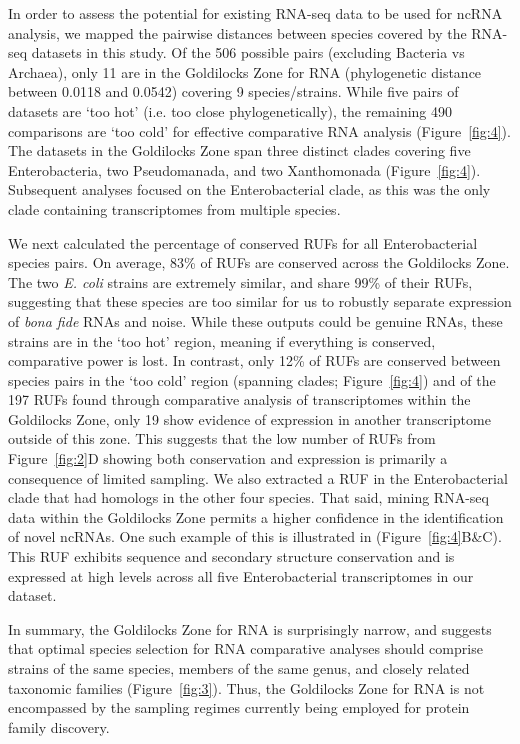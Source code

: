 \documentclass[10pt]{article}
\begin{document}
In order to assess the potential for existing RNA-seq data to be used
for ncRNA analysis, we mapped the pairwise distances between species
covered by the RNA-seq datasets in this study. Of the 506 possible
pairs (excluding Bacteria vs Archaea), only 11 are in the Goldilocks
Zone for RNA (phylogenetic distance between 0.0118 and 0.0542)
covering 9 species/strains. While five pairs of datasets are ‘too hot’
(i.e. too close phylogenetically), the remaining 490 comparisons are
‘too cold’ for effective comparative RNA analysis
(Figure~\ref{fig:4}). The datasets in the Goldilocks Zone span three
distinct clades covering five Enterobacteria, two Pseudomanada, and
two Xanthomonada (Figure~\ref{fig:4}). Subsequent analyses focused on
the Enterobacterial clade, as this was the only clade containing
transcriptomes from multiple species.

We next calculated the percentage of conserved RUFs for all
Enterobacterial species pairs. On average, 83\% of RUFs are conserved
across the Goldilocks Zone. The two \emph{E. coli} strains are extremely
similar, and share 99\% of their RUFs, suggesting that these species
are too similar for us to robustly separate expression of \emph{bona fide}
RNAs and noise. While these outputs could be genuine RNAs, these
strains are in the ‘too hot’ region, meaning if everything is
conserved, comparative power is lost. In contrast, only 12\% of RUFs
are conserved between species pairs in the ‘too cold’ region (spanning
clades; Figure~\ref{fig:4}) and of the 197 RUFs found through
comparative analysis of transcriptomes within the Goldilocks Zone,
only 19 show evidence of expression in another transcriptome outside
of this zone. This suggests that the low number of RUFs from
Figure~\ref{fig:2}D showing both conservation and expression is
primarily a consequence of limited sampling.  We also extracted a RUF
in the Enterobacterial clade that had homologs in the other four
species.  That said, mining RNA-seq data within the Goldilocks Zone
permits a higher confidence in the identification of novel ncRNAs. One
such example of this is illustrated in (Figure~\ref{fig:4}B\&C). This
RUF exhibits sequence and secondary structure conservation and is
expressed at high levels across all five Enterobacterial
transcriptomes in our dataset.

In summary, the Goldilocks Zone for RNA is surprisingly narrow, and
suggests that optimal species selection for RNA comparative analyses
should comprise strains of the same species, members of the same
genus, and closely related taxonomic families (Figure~\ref{fig:3}). Thus, the
Goldilocks Zone for RNA is not encompassed by the sampling regimes
currently being employed for protein family discovery.
\end{document}
